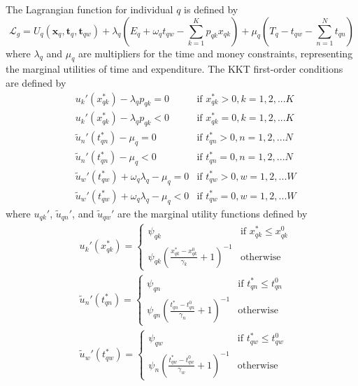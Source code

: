 The Lagrangian function for individual $q$ is defined by
\begin{equation}
    \mathcal{L}_g = U_q\left(\bm{x}_q,\bm{t}_q,\bm{t}_{qw}\right) + \lambda_q\left(E_q + \omega_q t_{qw} - \sum_{k=1}^K p_{qk}x_{qk}\right) + \mu_{q}\left(T_q - t_{qw} - \sum_{n=1}^N t_{qn}\right)
\end{equation}
where $\lambda_q$ and $\mu_q$ are multipliers for the time and money constraints, representing the marginal utilities of time and expenditure. The KKT first-order conditions are defined by
\begin{subequations}\label{eq:kkt1}
    \begin{align}
        &u_k'\left(x_{qk}^*\right) - \lambda_q p_{qk} = 0 & \text{if } x_{qk}^* > 0,k=1,2,...K \\
        &u_k'\left(x_{qk}^*\right) - \lambda_q p_{qk} < 0 & \text{if } x_{qk}^* = 0,k=1,2,...K \\
        &\widetilde{u}_n'\left(t_{qn}^*\right) - \mu_q = 0 & \text{if } t_{qn}^* > 0,n=1,2,...N \\
        &\widetilde{u}_n'\left(t_{qn}^*\right) - \mu_q < 0 & \text{if } t_{qn}^* = 0,n=1,2,...N \\
        &\widetilde{u}_w'\left(t_{qw}^*\right) +\omega_q \lambda_q - \mu_q = 0 & \text{if } t_{qw}^* > 0,w=1,2,...W \\
        &\widetilde{u}_w'\left(t_{qw}^*\right) +\omega_q \lambda_q - \mu_q < 0 & \text{if } t_{qw}^* = 0,w=1,2,...W
    \end{align}
\end{subequations}
where $u_{qk}'$, $\widetilde{u}_{qn}'$, and $\widetilde{u}_{qw}'$ are the marginal utility functions defined by
\begin{subequations}\label{eq:kkt2}
    \begin{align}
        &u_k'(x_{qk}^*) = 
        \begin{cases}
        \psi_{qk} & \text{if } x_{qk}^* \leq x_{qk}^0 \\
        \psi_{qk}\left(\frac{x_{qk}^* - x_{qk}^0}{\gamma_k}+1\right)^{-1} & \text{otherwise}
        \end{cases} \\
        &\widetilde{u}_n'(t_{qn}^*) = 
        \begin{cases}
        \psi_{qn} & \text{if } t_{qn}^* \leq t_{qn}^0 \\
        \psi_{qn} \left(\frac{t_{qn}^* - t_{qn}^0}{\gamma_n}+1\right)^{-1} & \text{otherwise}
        \end{cases} \\
        &\widetilde{u}_w'(t_{qw}^*) = 
        \begin{cases}
        \psi_{qw} & \text{if } t_{qw}^* \leq t_{qw}^0 \\
        \psi_n \left(\frac{t_{qw}^* - t_{qw}^0}{\gamma_w}+1\right)^{-1} & \text{otherwise}
        \end{cases}
    \end{align}
\end{subequations}

